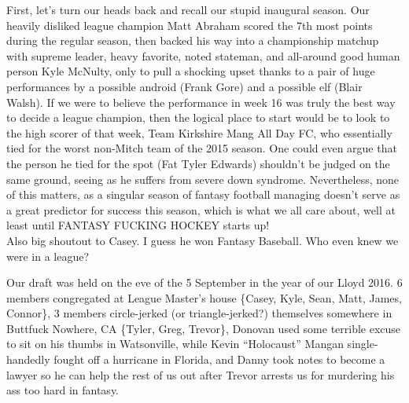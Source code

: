 \documentclass[11pt,letterpaper]{article}
\begin{document}
First, let's turn our heads back and recall our stupid inaugural season. Our heavily disliked league champion Matt Abraham scored the 7th most points during the regular season, then backed his way into a championship matchup with supreme leader, heavy favorite, noted stateman, and all-around good human person Kyle McNulty, only to pull a shocking upset thanks to a pair of huge performances by a possible android (Frank Gore) and a possible elf (Blair Walsh). If we were to believe the performance in week 16 was truly the best way to decide a league champion, then the logical place to start would be to look to the high scorer of that week, Team Kirkshire Mang All Day FC, who essentially tied for the worst non-Mitch team of the 2015 season. One could even argue that the person he tied for the spot (Fat Tyler Edwards) shouldn't be judged on the same ground, seeing as he suffers from severe down syndrome. Nevertheless, none of this matters, as a singular season of fantasy football managing doesn't serve as a great predictor for success this season, which is what we all care about, well at least until FANTASY FUCKING HOCKEY starts up!
\\[5mm] Also big shoutout to Casey. I guess he won Fantasy Baseball. Who even knew we were in a league?


Our draft was held on the eve of the 5 September in the year of our Lloyd 2016. 6 members congregated at League Master's house \{Casey, Kyle, Sean, Matt, James, Connor\}, 3 members circle-jerked (or triangle-jerked?) themselves somewhere in Buttfuck Nowhere, CA \{Tyler, Greg, Trevor\}, Donovan used some terrible excuse to sit on his thumbs in Watsonville, while Kevin ``Holocaust'' Mangan single-handedly fought off a hurricane in Florida, and Danny took notes to become a lawyer so he can help the rest of us out after Trevor arrests us for murdering his ass too hard in fantasy.
\end{document}
